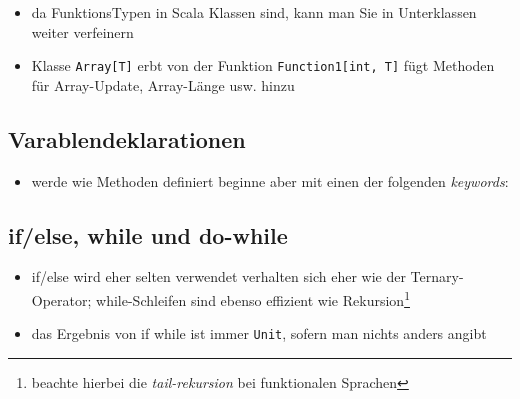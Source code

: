 

\begin{itemize}
  \item da FunktionsTypen in Scala Klassen sind, kann man Sie in Unterklassen
  weiter verfeinern
  \item Klasse \texttt{Array[T]} erbt von der Funktion \texttt{Function1[int, T]}
  \und fügt Methoden für Array-Update, Array-Länge usw. hinzu
  
  
\end{itemize}


\subsection{Varablendeklarationen}
\begin{itemize}
  \item werde wie Methoden definiert beginne aber mit einen der folgenden
  \textit{keywords}:
  

\end{itemize}


\subsection{if/else, while und do-while}
\begin{itemize}
  \item if/else wird eher selten verwendet \und verhalten sich eher wie
  der Ternary-Operator; while-Schleifen sind ebenso effizient wie 
  Rekursion\footnote{beachte hierbei die \textit{tail-rekursion} bei
  funktionalen Sprachen}
  
  
  
  \item das Ergebnis von if \und while ist immer \texttt{Unit}, sofern man nichts
  anders angibt
\end{itemize}


